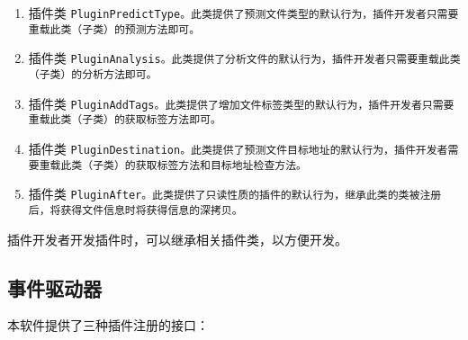 \begin{enumerate}
    \item 插件类 \tt{PluginPredictType}。此类提供了预测文件类型的默认行为，插件开发者只需要重载此类（子类）的预测方法即可。
    \item 插件类 \tt{PluginAnalysis}。此类提供了分析文件的默认行为，插件开发者只需要重载此类（子类）的分析方法即可。
    \item 插件类 \tt{PluginAddTags}。此类提供了增加文件标签类型的默认行为，插件开发者只需要重载此类（子类）的获取标签方法即可。
    \item 插件类 \tt{PluginDestination}。此类提供了预测文件目标地址的默认行为，插件开发者需要重载此类（子类）的获取标签方法和目标地址检查方法。
    \item 插件类 \tt{PluginAfter}。此类提供了只读性质的插件的默认行为，继承此类的类被注册后，将获得文件信息时将获得信息的深拷贝。
\end{enumerate}

插件开发者开发插件时，可以继承相关插件类，以方便开发。

\subsection{事件驱动器}

本软件提供了三种插件注册的接口：

